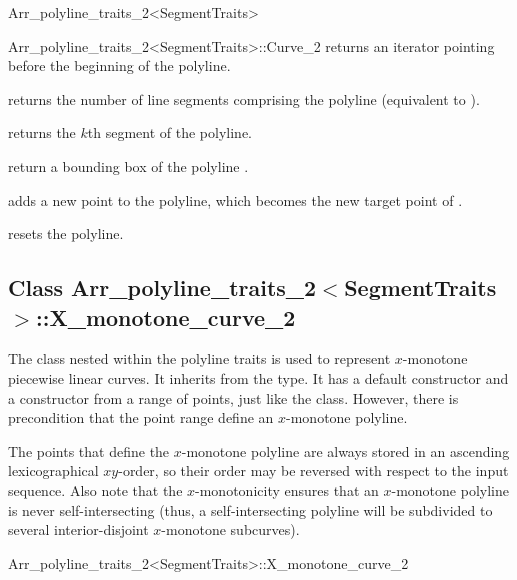 \begin{ccRefClass}{Arr_polyline_traits_2<SegmentTraits>}
\begin{ccClass}{Arr_polyline_traits_2<SegmentTraits>::Curve_2}
  {returns an iterator pointing before the beginning of the polyline.}

  {returns the number of line segments comprising the polyline
   (equivalent to ).}

  {returns the $k$th segment of the polyline.
   }

  {return a bounding box of the polyline \ccVar{}.}

\ccOperations

  {adds a new point to the polyline, which becomes the new target point
   of \ccVar{}.}

  {resets the polyline.}

\end{ccClass}

\subsection*{Class 
  Arr\_polyline\_traits\_2$<$SegmentTraits$>$::X\_monotone\_curve\_2}

The  class nested within the polyline traits is used
to represent $x$-monotone piecewise linear curves. It inherits from the
 type. It has a default constructor and a constructor from a
range of points, just like the  class. However, there is
precondition that the point range define an $x$-monotone polyline.

The points that define the $x$-monotone polyline are
always stored in an ascending lexicographical $xy$-order, so their order may
be reversed with respect to the input sequence. Also note that the
$x$-monotonicity ensures that an $x$-monotone polyline is never
self-intersecting (thus, a self-intersecting polyline will be subdivided
to several interior-disjoint $x$-monotone subcurves).

\begin{ccClass}{Arr_polyline_traits_2<SegmentTraits>::X_monotone_curve_2}
\end{ccClass}

\ccSeeAlso
    \\
    \\

\end{ccRefClass}
\ccRefPageEnd
